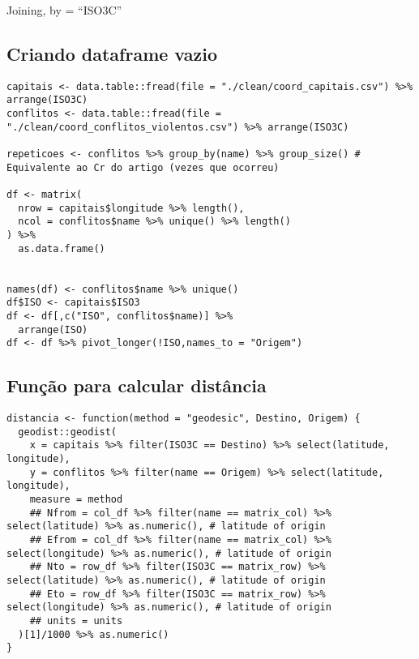 \documentclass[11pt]{article}
\begin{document}
Joining, by = ``ISO3C''



\subsection*{Criando dataframe vazio}
\label{sec:orge2d5157}

\begin{verbatim}
capitais <- data.table::fread(file = "./clean/coord_capitais.csv") %>% arrange(ISO3C)
conflitos <- data.table::fread(file = "./clean/coord_conflitos_violentos.csv") %>% arrange(ISO3C)

repeticoes <- conflitos %>% group_by(name) %>% group_size() # Equivalente ao Cr do artigo (vezes que ocorreu)

df <- matrix(
  nrow = capitais$longitude %>% length(),
  ncol = conflitos$name %>% unique() %>% length()
) %>%
  as.data.frame()


names(df) <- conflitos$name %>% unique()
df$ISO <- capitais$ISO3
df <- df[,c("ISO", conflitos$name)] %>%
  arrange(ISO)
df <- df %>% pivot_longer(!ISO,names_to = "Origem")
\end{verbatim}








\subsection*{Função para calcular distância}
\label{sec:org6ec6c3a}

\begin{verbatim}
distancia <- function(method = "geodesic", Destino, Origem) {
  geodist::geodist(
    x = capitais %>% filter(ISO3C == Destino) %>% select(latitude, longitude),
    y = conflitos %>% filter(name == Origem) %>% select(latitude, longitude),
    measure = method
    ## Nfrom = col_df %>% filter(name == matrix_col) %>% select(latitude) %>% as.numeric(), # latitude of origin
    ## Efrom = col_df %>% filter(name == matrix_col) %>% select(longitude) %>% as.numeric(), # latitude of origin
    ## Nto = row_df %>% filter(ISO3C == matrix_row) %>% select(latitude) %>% as.numeric(), # latitude of origin
    ## Eto = row_df %>% filter(ISO3C == matrix_row) %>% select(longitude) %>% as.numeric(), # latitude of origin
    ## units = units
  )[1]/1000 %>% as.numeric()
}
\end{verbatim}
\end{document}
